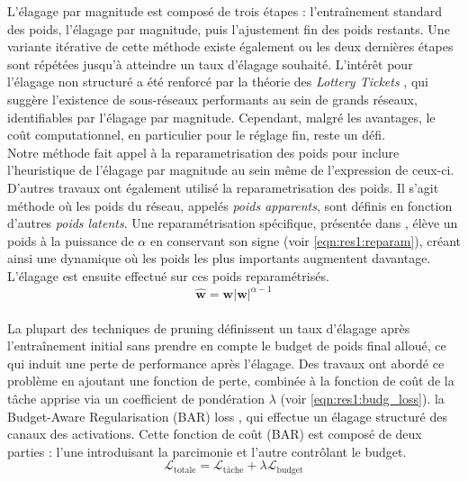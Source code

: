 L'élagage par magnitude est composé de trois étapes : l'entraînement standard
des poids, l'élagage par magnitude, puis l'ajustement fin des poids restants.
Une variante itérative \cite{DBLP:conf/nips/HanPTD15} de cette méthode existe
également ou les deux dernières étapes sont répétées jusqu'à atteindre un taux
d'élagage souhaité. L'intérêt pour l'élagage non structuré a été renforcé par la
théorie des \textit{Lottery Tickets} \cite{DBLP:conf/iclr/FrankleC19}, qui
suggère l'existence de sous-réseaux performants au sein de grands réseaux,
identifiables par l'élagage par magnitude. Cependant, malgré les avantages, le
coût computationnel, en particulier pour le réglage fin, reste un défi.\\

Notre méthode fait appel à la reparametrisation des poids pour inclure
l'heuristique de l'élagage par magnitude au sein même de l'expression de
ceux-ci. D'autres travaux ont également utilisé la reparametrisation des poids.
Il s'agit méthode où les poids du réseau, appelés \emph{poids apparents}, sont définis
en fonction d'autres \emph{poids latents}. Une reparamétrisation spécifique,
présentée dans \cite{powerprop}, élève un poids à la puissance de $\alpha$
en conservant son signe (voir \cref{eqn:res1:reparam}), créant ainsi une dynamique où les poids les plus
importants augmentent davantage. L'élagage est ensuite effectué sur ces poids
reparamétrisés.\\

\begin{equation}
  \mathbf{\hat{w}} = \mathbf{w} |\mathbf{w}|^{\alpha-1}
  \label{eqn:res1:reparam}
\end{equation}\\


La plupart des techniques de pruning définissent un taux d'élagage après
l'entraînement initial sans prendre en compte le budget de poids final alloué,
ce qui induit une perte de performance après l'élagage. Des travaux ont abordé
ce problème en ajoutant une fonction de perte, combinée à la fonction de coût de
la tâche apprise via un coefficient de pondération $\lambda$ (voir
\cref{eqn:res1:budg_loss}). la Budget-Aware Regularisation (BAR) loss
\cite{lemaire2019structured}, qui effectue un élagage structuré des canaux des
activations. Cette fonction de coût (BAR) est composé de deux parties : l'une
introduisant la parcimonie et l'autre contrôlant le budget.\\

\begin{equation}
  \mathcal{L}_{\text{totale}} = \mathcal{L}_{\text{tâche}} + \lambda \mathcal{L}_{\text{budget}}
  \label{eqn:res1:budg_loss}
\end{equation}\\


